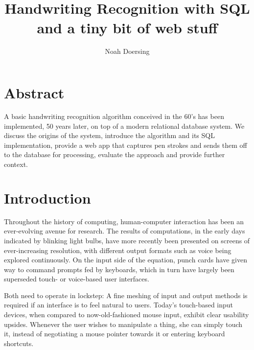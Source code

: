 \documentclass[sigconf]{acmart}
\begin{document}
\title{\\\vspace{-0.3em}Handwriting Recognition with SQL\\\vspace{-0.1em}\hspace{6.88cm}\footnotesize and a tiny bit of web stuff\vspace{-1em}}
\author{Noah Doersing}
\affiliation{}

\maketitle

\section*{Abstract}
A basic handwriting recognition algorithm conceived in the 60's has been implemented, 50 years later, on top of a modern relational database system. We discuss the origins of the system, introduce the algorithm and its SQL implementation, provide a web app that captures pen strokes and sends them off to the database for processing, evaluate the approach and provide further context.

\section{Introduction}

Throughout the history of computing, human-computer interaction has been an ever-evolving avenue for research. The results of computations, in the early days indicated by blinking light bulbs, have more recently been presented on screens of ever-increasing resolution, with different output formats such as voice being explored continuously. On the input side of the equation, punch cards have given way to command prompts fed by keyboards, which in turn have largely been superseded touch- or voice-based user interfaces.

Both need to operate in lockstep: A fine meshing of input and output methods is required if an interface is to feel natural to users. Today's touch-based input devices, when compared to now-old-fashioned mouse input, exhibit clear usability upsides. Whenever the user wishes to manipulate a thing, she can simply touch it, instead of negotiating a mouse pointer towards it or entering keyboard shortcuts.
\end{document}
